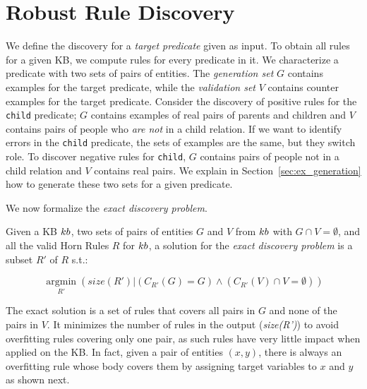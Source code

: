 \section{Robust Rule Discovery} \label{sec:problem}
We define the discovery for a {\em target predicate} given as input. 
To obtain all rules for a given KB, %
we compute rules for every predicate in it. %
We characterize a predicate with two sets of pairs of entities.
%
The \emph{generation set} $G$ contains examples for the target predicate, 
while the \emph{validation set} $V$ contains counter examples for the target predicate.
Consider the discovery of positive rules for the {\tt child} predicate; $G$ contains examples of real pairs of parents and children and $V$ contains pairs of people who {\em are not} in a child relation. If we want to identify errors in the {\tt child} predicate, the sets of examples are the same, but they switch role. To discover negative rules for {\tt child}, $G$ contains pairs of people not in a child relation and $V$ contains real pairs.
We explain in Section~\ref{sec:ex_generation} how to generate these two sets for a given predicate. 

We now formalize the \emph{exact discovery problem}. %

\begin{definition}
	Given a KB ${\sc kb}$, two sets of pairs of entities $G$ and $V$ from ${\sc kb}$ with $G \cap V = \emptyset$, and all the valid Horn Rules $R$ for ${\sc kb}$, a solution for the \emph{exact discovery problem} is a subset $R'$ of $R$  s.t.:
	
	\vspace{-4mm}	
	\begin{equation*}
		\underset{R'}{\operatorname{argmin}}(size(R') | (C_{R'}(G) = G) \wedge (C_{R'}(V) \cap V = \emptyset))	\end{equation*}
	\end{definition}
	\vspace{-1ex}	

The exact solution is a set of rules that covers all pairs in $G$ and none of the pairs in $V$. It minimizes the number of rules in the output ({\em size(R')}) to avoid overfitting rules covering only one pair, as such rules %
have very little impact when applied on the KB. In fact, given a pair of entities $(x,y)$, there is always an overfitting rule whose body covers them by assigning target variables to $x$ and $y$ as shown next. %



